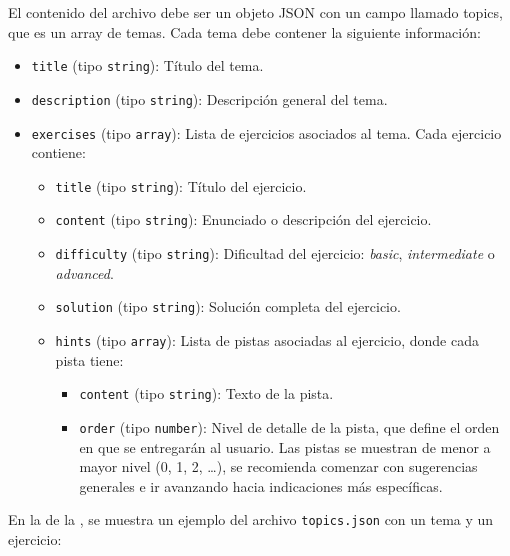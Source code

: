 El contenido del archivo debe ser un objeto JSON con un campo llamado topics, que es un array de temas. Cada tema debe contener la siguiente información:
\begin{itemize}
    \item \texttt{title} (tipo \texttt{string}): Título del tema.
    \item \texttt{description} (tipo \texttt{string}): Descripción general del tema.
    \item \texttt{exercises} (tipo \texttt{array}): Lista de ejercicios asociados al tema. Cada ejercicio contiene:
    \begin{itemize}
        \item \texttt{title} (tipo \texttt{string}): Título del ejercicio.
        \item \texttt{content} (tipo \texttt{string}): Enunciado o descripción del ejercicio.
        \item \texttt{difficulty} (tipo \texttt{string}): Dificultad del ejercicio: \textit{basic}, \textit{intermediate} o \textit{advanced}.
        \item \texttt{solution} (tipo \texttt{string}): Solución completa del ejercicio.
        \item \texttt{hints} (tipo \texttt{array}): Lista de pistas asociadas al ejercicio, donde cada pista tiene:
        \begin{itemize}
            \item \texttt{content} (tipo \texttt{string}): Texto de la pista.
            \item \texttt{order} (tipo \texttt{number}): Nivel de detalle de la pista, que define el orden en que se entregarán al usuario. Las pistas se muestran de menor a mayor nivel (0, 1, 2, \ldots), se recomienda comenzar con sugerencias generales e ir avanzando hacia indicaciones más específicas.
        \end{itemize}
    \end{itemize}
\end{itemize}

En la  de la , se muestra un ejemplo del archivo \texttt{topics.json} con un tema y un ejercicio:


